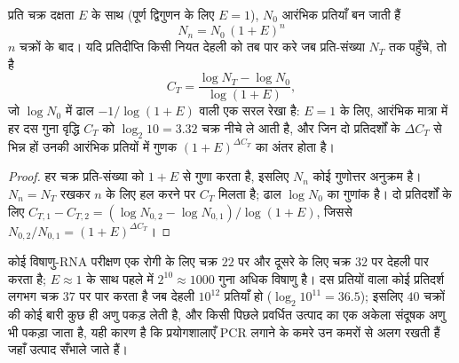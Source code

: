 \begin{theorem}\label{thm:b3:genetic-engineering:pcr}
प्रति चक्र दक्षता $E$ के साथ (पूर्ण द्विगुणन के लिए $E = 1$), $N_{0}$
आरंभिक प्रतियाँ बन जाती हैं
\[
N_{n} = N_{0}\,(1 + E)^{n}
\]
$n$ चक्रों के बाद। यदि प्रतिदीप्ति किसी नियत देहली को तब पार करे जब
प्रति-संख्या $N_{T}$ तक पहुँचे, तो \emph{} है
\[
C_{T} = \frac{\log N_{T} - \log N_{0}}{\log(1 + E)},
\]
जो $\log N_{0}$ में ढाल $-1/\log(1+E)$ वाली एक सरल रेखा है: $E = 1$ के
लिए, आरंभिक मात्रा में हर दस गुना वृद्धि $C_{T}$ को
$\log_{2} 10 = 3.32$ चक्र नीचे ले आती है, और जिन दो प्रतिदर्शों के
 $\Delta C_{T}$ से भिन्न हों उनकी आरंभिक प्रतियों में गुणक
$(1 + E)^{\Delta C_{T}}$ का अंतर होता है।
\end{theorem}
\begin{proof}
हर चक्र प्रति-संख्या को $1 + E$ से गुणा करता है, इसलिए $N_{n}$ कोई
गुणोत्तर अनुक्रम है। $N_{n} = N_{T}$ रखकर $n$ के लिए हल करने पर
$C_{T}$ मिलता है; ढाल $\log N_{0}$ का गुणांक है। दो प्रतिदर्शों के लिए
$C_{T,1} - C_{T,2} = (\log N_{0,2} - \log N_{0,1})/\log(1+E)$, जिससे
$N_{0,2}/N_{0,1} = (1+E)^{\Delta C_{T}}$।
\end{proof}

\begin{example}[कोई qPCR पट्टिका पढ़ना]\label{ex:b3:genetic-engineering:qpcr}
कोई विषाणु-RNA परीक्षण एक रोगी के लिए चक्र $22$ पर और दूसरे के लिए
चक्र $32$ पर देहली पार करता है; $E \approx 1$ के साथ पहले में $2^{10}
\approx 1000$ गुना अधिक विषाणु है। दस प्रतियों वाला कोई प्रतिदर्श लगभग
चक्र $37$ पर पार करता है जब देहली $10^{12}$ प्रतियाँ हो ($\log_{2} 10^{11} =
36.5$); इसलिए $40$ चक्रों की कोई बारी कुछ ही अणु पकड़ लेती है, और किसी
पिछले प्रवर्धित उत्पाद का एक अकेला संदूषक अणु भी पकड़ा जाता है, यही
कारण है कि प्रयोगशालाएँ PCR लगाने के कमरे उन कमरों से अलग रखती हैं जहाँ
उत्पाद सँभाले जाते हैं।
\end{example}

